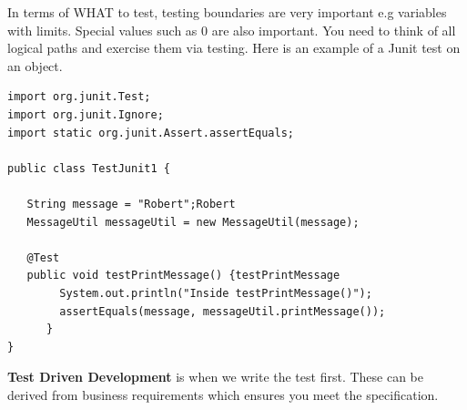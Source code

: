 \documentclass{article}
\begin{document}
In terms of WHAT to test, testing boundaries are very important e.g variables with limits. Special values such as 0 are also important. You need to think of all logical paths and exercise them via testing. Here is an example of a Junit test on an object.

\begin{lstlisting}
import org.junit.Test;
import org.junit.Ignore;
import static org.junit.Assert.assertEquals;

public class TestJunit1 {

   String message = "Robert";Robert
   MessageUtil messageUtil = new MessageUtil(message);

   @Test
   public void testPrintMessage() {testPrintMessage
        System.out.println("Inside testPrintMessage()");    
        assertEquals(message, messageUtil.printMessage());     
      }
}

\end{lstlisting}

\textbf{Test Driven Development} is when we write the test first. These can be derived from business requirements which ensures you meet the specification.
\end{document}
